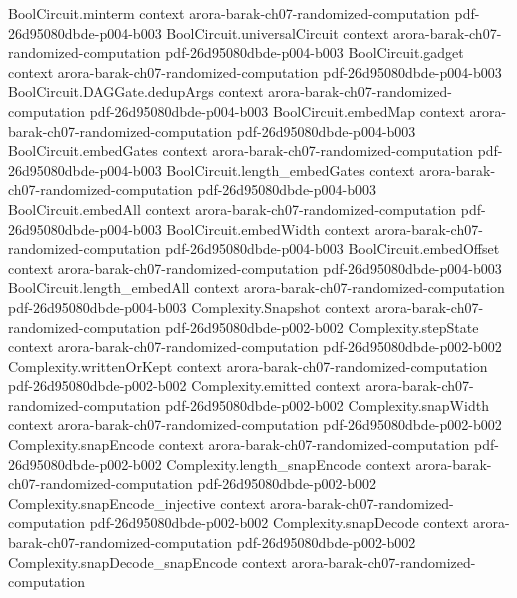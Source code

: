 \begin{theorem}
\proofstep
  {BoolCircuit.minterm}
  {context}
  {arora-barak-ch07-randomized-computation}
  {pdf-26d95080dbde-p004-b003}
\proofstep
  {BoolCircuit.universalCircuit}
  {context}
  {arora-barak-ch07-randomized-computation}
  {pdf-26d95080dbde-p004-b003}
\proofstep
  {BoolCircuit.gadget}
  {context}
  {arora-barak-ch07-randomized-computation}
  {pdf-26d95080dbde-p004-b003}
\proofstep
  {BoolCircuit.DAGGate.dedupArgs}
  {context}
  {arora-barak-ch07-randomized-computation}
  {pdf-26d95080dbde-p004-b003}
\proofstep
  {BoolCircuit.embedMap}
  {context}
  {arora-barak-ch07-randomized-computation}
  {pdf-26d95080dbde-p004-b003}
\proofstep
  {BoolCircuit.embedGates}
  {context}
  {arora-barak-ch07-randomized-computation}
  {pdf-26d95080dbde-p004-b003}
\proofstep
  {BoolCircuit.length_embedGates}
  {context}
  {arora-barak-ch07-randomized-computation}
  {pdf-26d95080dbde-p004-b003}
\proofstep
  {BoolCircuit.embedAll}
  {context}
  {arora-barak-ch07-randomized-computation}
  {pdf-26d95080dbde-p004-b003}
\proofstep
  {BoolCircuit.embedWidth}
  {context}
  {arora-barak-ch07-randomized-computation}
  {pdf-26d95080dbde-p004-b003}
\proofstep
  {BoolCircuit.embedOffset}
  {context}
  {arora-barak-ch07-randomized-computation}
  {pdf-26d95080dbde-p004-b003}
\proofstep
  {BoolCircuit.length_embedAll}
  {context}
  {arora-barak-ch07-randomized-computation}
  {pdf-26d95080dbde-p004-b003}
\proofstep
  {Complexity.Snapshot}
  {context}
  {arora-barak-ch07-randomized-computation}
  {pdf-26d95080dbde-p002-b002}
\proofstep
  {Complexity.stepState}
  {context}
  {arora-barak-ch07-randomized-computation}
  {pdf-26d95080dbde-p002-b002}
\proofstep
  {Complexity.writtenOrKept}
  {context}
  {arora-barak-ch07-randomized-computation}
  {pdf-26d95080dbde-p002-b002}
\proofstep
  {Complexity.emitted}
  {context}
  {arora-barak-ch07-randomized-computation}
  {pdf-26d95080dbde-p002-b002}
\proofstep
  {Complexity.snapWidth}
  {context}
  {arora-barak-ch07-randomized-computation}
  {pdf-26d95080dbde-p002-b002}
\proofstep
  {Complexity.snapEncode}
  {context}
  {arora-barak-ch07-randomized-computation}
  {pdf-26d95080dbde-p002-b002}
\proofstep
  {Complexity.length_snapEncode}
  {context}
  {arora-barak-ch07-randomized-computation}
  {pdf-26d95080dbde-p002-b002}
\proofstep
  {Complexity.snapEncode_injective}
  {context}
  {arora-barak-ch07-randomized-computation}
  {pdf-26d95080dbde-p002-b002}
\proofstep
  {Complexity.snapDecode}
  {context}
  {arora-barak-ch07-randomized-computation}
  {pdf-26d95080dbde-p002-b002}
\proofstep
  {Complexity.snapDecode_snapEncode}
  {context}
  {arora-barak-ch07-randomized-computation}

\end{theorem}
